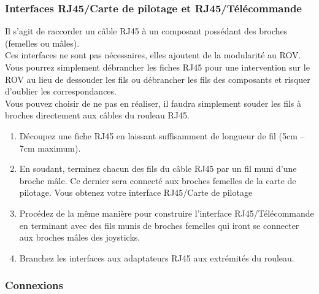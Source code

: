 \documentclass[11pt,a4paper]{article}
\begin{document}
        \subsubsection{Interfaces RJ45/Carte de pilotage et RJ45/Télécommande}
          Il s'agit de raccorder un câble RJ45 à un composant possédant des broches (femelles ou mâles). \\
          Ces interfaces ne sont pas nécessaires, elles ajoutent de la modularité au ROV. Vous pourrez simplement débrancher les fiches RJ45 pour une intervention sur le ROV au lieu de dessouder les fils ou débrancher les fils des composants et risquer d'oublier les correspondances.\\
          Vous pouvez choisir de ne pas en réaliser, il faudra simplement souder les fils à broches directement aux câbles du rouleau RJ45.
          
          \begin{enumerate}
            \item Découpez une fiche RJ45 en laissant suffisamment de longueur de fil (5cm -- 7cm maximum).
            
            \item En soudant, terminez chacun des fils du câble RJ45 par un fil muni d'une broche mâle. Ce dernier sera connecté aux broches femelles de la carte de pilotage. Vous obtenez votre interface RJ45/Carte de pilotage
            
            \item Procédez de la même manière pour construire l'interface RJ45/Télécommande en terminant avec des fils munis de broches femelles qui iront se connecter aux broches mâles des joysticks.
            
            \item Branchez les interfaces aux adaptateurs RJ45 aux extrémités du rouleau. 
            
          \end{enumerate}
        \subsubsection{Connexions}
          
      
\end{document}
